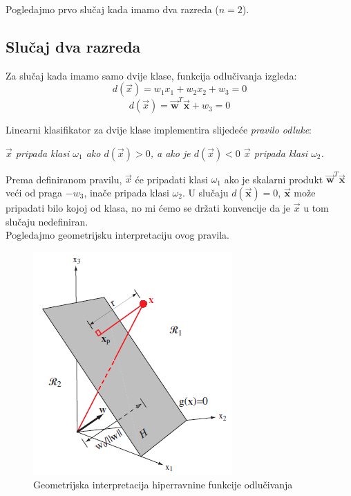 \documentclass{book}
\begin{document}
Pogledajmo prvo slučaj kada imamo dva razreda ($n=2$).


\subsection{Slučaj dva razreda}

Za slučaj kada imamo samo dvije klase, funkcija odlučivanja izgleda:
$$ d(\vec{x}) = w_1x_1 + w_2x_2 + w_3 = 0 $$
$$ d(\vec{x}) = \vec{\mathbf{w}}^T\vec{\mathbf{x}} + w_{3} = 0 $$

Linearni
klasifikator za dvije klase implementira slijedeće \textit{pravilo odluke}:
\begin{shaded}

\textit{$\vec{x}$ pripada klasi $\omega_1$ ako $d(\vec{x})>0$, a ako je
 $d(\vec{x})<0$ $\vec{x}$ pripada klasi $\omega_2$.} \\
\end{shaded}

Prema definiranom pravilu, $\vec{x}$ će pripadati klasi $\omega_1$ ako je
skalarni produkt $\vec{\mathbf{w}}^T\vec{\mathbf{x}}$ veći od praga $-w_3$,
inače pripada klasi $\omega_2$. U slučaju $d(\vec{\mathbf{x}}) = 0$,
$\vec{\mathbf{x}}$ može pripadati bilo kojoj od klasa, no mi ćemo se držati
konvencije da je $\vec{x}$ u tom slučaju nedefiniran.\\
 
Pogledajmo geometrijsku interpretaciju ovog pravila. \\

\begin{figure}[H]
\begin{center}
\includegraphics[scale=0.6]{./pics/geomterijska_int}
\caption{Geometrijska interpretacija hiperravnine funkcije odlučivanja}
\end{center}
\end{figure}
\end{document}
